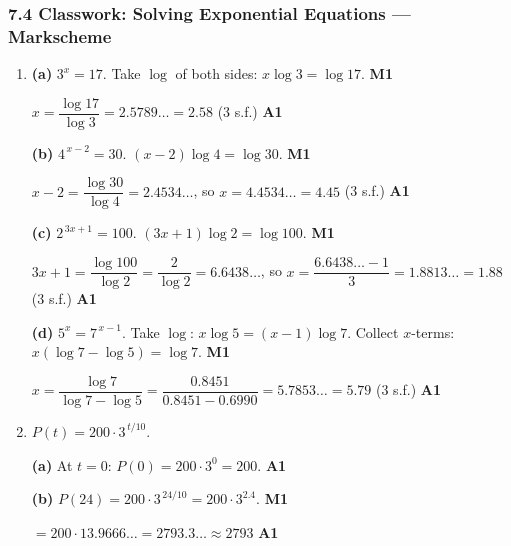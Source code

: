 \documentclass[12pt, twoside]{article}
\begin{document}
\subsubsection*{7.4 Classwork: Solving Exponential Equations --- Markscheme}

\begin{enumerate}[itemsep=0.3cm]

\item[1.] [Maximum mark: 8]

\textbf{(a)} $3^x = 17$. \;Take $\log$ of both sides:
$x \log 3 = \log 17$. \hfill \textbf{M1}

$x = \dfrac{\log 17}{\log 3} = 2.5789\ldots = 2.58$ (3 s.f.) \hfill \textbf{A1}

\medskip

\textbf{(b)} $4^{\,x-2} = 30$. \;$(x - 2) \log 4 = \log 30$. \hfill \textbf{M1}

$x - 2 = \dfrac{\log 30}{\log 4} = 2.4534\ldots$, \;so\;
$x = 4.4534\ldots = 4.45$ (3 s.f.) \hfill \textbf{A1}

\medskip

\textbf{(c)} $2^{\,3x+1} = 100$. \;$(3x + 1) \log 2 = \log 100$.
\hfill \textbf{M1}

$3x + 1 = \dfrac{\log 100}{\log 2} = \dfrac{2}{\log 2} = 6.6438\ldots$, \;so\;
$x = \dfrac{6.6438\ldots - 1}{3} = 1.8813\ldots = 1.88$ (3 s.f.)
\hfill \textbf{A1}

\medskip

\textbf{(d)} $5^x = 7^{\,x-1}$. \;Take $\log$:
$x \log 5 = (x - 1)\log 7$. Collect $x$-terms:
$x(\log 7 - \log 5) = \log 7$. \hfill \textbf{M1}

$x = \dfrac{\log 7}{\log 7 - \log 5}
= \dfrac{0.8451}{0.8451 - 0.6990}
= 5.7853\ldots = 5.79$ (3 s.f.) \hfill \textbf{A1}

\newpage

\item[2.] [Maximum mark: 7]

$P(t) = 200 \cdot 3^{\,t/10}$.

\textbf{(a)} At $t = 0$: $P(0) = 200 \cdot 3^0 = 200$. \hfill \textbf{A1}

\medskip

\textbf{(b)} $P(24) = 200 \cdot 3^{\,24/10} = 200 \cdot 3^{2.4}$. \hfill \textbf{M1}

$= 200 \cdot 13.9666\ldots = 2793.3\ldots \approx 2793$ \hfill \textbf{A1}

\medskip


\end{enumerate}
\end{document}

